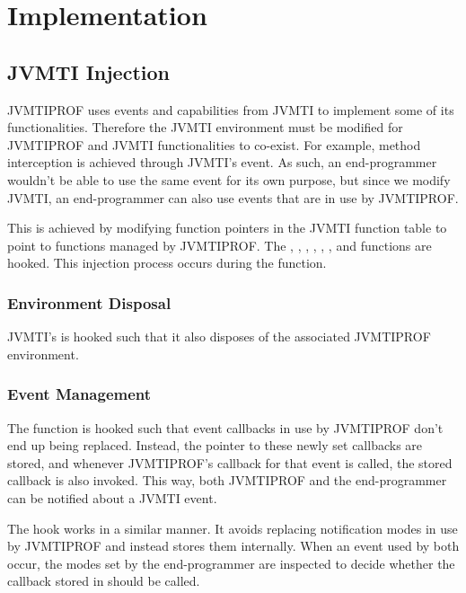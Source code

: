 \section{Implementation} \label{sec:impl}

\subsection{JVMTI Injection}

JVMTIPROF uses events and capabilities from JVMTI to implement some of its functionalities. Therefore the JVMTI environment must be modified for JVMTIPROF and JVMTI functionalities to co-exist. For example, method interception is achieved through JVMTI's  event. As such, an end-programmer wouldn't be able to use the same event for its own purpose, but since we modify JVMTI, an end-programmer can also use events that are in use by JVMTIPROF.

This is achieved by modifying function pointers in the JVMTI function table to point to functions managed by JVMTIPROF. The , , , , , ,  and  functions are hooked. This injection process occurs during the  function.

\subsubsection*{Environment Disposal}

JVMTI's  is hooked such that it also disposes of the associated JVMTIPROF environment.

\subsubsection*{Event Management}

The  function is hooked such that event callbacks in use by JVMTIPROF don't end up being replaced. Instead, the pointer to these newly set callbacks are stored, and whenever JVMTIPROF's callback for that event is called, the stored callback is also invoked. This way, both JVMTIPROF and the end-programmer can be notified about a JVMTI event.

The  hook works in a similar manner. It avoids replacing notification modes in use by JVMTIPROF and instead stores them internally. When an event used by both occur, the modes set by the end-programmer are inspected to decide whether the callback stored in  should be called.

